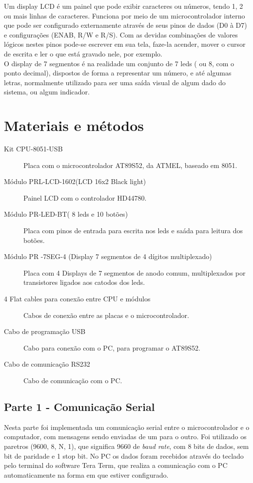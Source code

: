 \documentclass[
    a4paper,
    brazil
    ]{article}
\begin{document}
    
    Um display LCD é um painel que pode exibir caracteres ou números, tendo 1, 2 ou mais linhas de caracteres. Funciona por meio de um microcontrolador interno que pode ser configurado externamente através de seus pinos de dados (D0 à D7) e configurações (ENAB, R/W e R/S). Com as devidas combinações de valores lógicos nestes pinos pode-se escrever em sua tela, faze-la acender, mover o cursor de escrita
    e ler o que está gravado nele, por exemplo.\\
    
    O display de 7 segmentos é na realidade um conjunto de 7 leds ( ou 8, com o ponto decimal), dispostos de forma a representar um número, e até algumas letras, normalmente utilizado para ser uma saída visual de algum dado do sistema, ou algum indicador.\\
    
    
    
    

\section{Materiais e métodos} 
    \begin{description}
        \item[Kit CPU-8051-USB] Placa com o microcontrolador AT89S52, da ATMEL, baseado em 8051.
        \item[Módulo PRL-LCD-1602(LCD 16x2 Black light)] Painel LCD com o controlador HD44780.
        \item[Módulo PR-LED-BT( 8 leds e 10 botões)] Placa com pinos de entrada para escrita nos leds e saáda para leitura dos botões.   
        \item[Módulo PR -7SEG-4 (Display 7 segmentos de 4 dígitos  multiplexado)] Placa com 4 Displays de 7 segmentos de anodo comum, multiplexados por transistores ligados aos catodos dos leds.
        \item[4 Flat cables para conexão entre CPU e módulos] Cabos de conexão entre as placas e o microcontrolador.  
        \item[Cabo de programação USB] Cabo para conexão com o PC, para programar o AT89S52.
        \item[Cabo de comunicação RS232] Cabo de comunicação com o PC.
    \end{description}
    
    \subsection{Parte 1 - Comunicação Serial}
        Nesta parte foi implementada um comunicação serial entre o microcontrolador e o computador, com mensagens sendo enviadas de um para o outro. Foi utilizado os paretros (9600, 8, N, 1), que significa 9660 de \emph{baud rate}, com 8 bits de dados, sem bit de paridade e 1 stop bit. No PC os dados foram recebidos através do teclado pelo terminal do software Tera Term, que realiza a comunicação com o PC automaticamente na forma em que estiver configurado.\\
        
\end{document}
